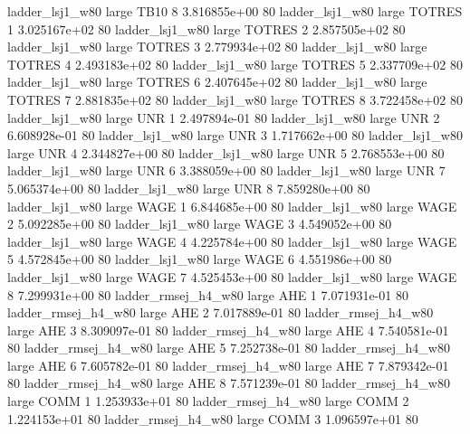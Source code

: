     ladder_lsj1_w80      large     TB10                 8 3.816855e+00 80
    ladder_lsj1_w80      large   TOTRES                 1 3.025167e+02 80
    ladder_lsj1_w80      large   TOTRES                 2 2.857505e+02 80
    ladder_lsj1_w80      large   TOTRES                 3 2.779934e+02 80
    ladder_lsj1_w80      large   TOTRES                 4 2.493183e+02 80
    ladder_lsj1_w80      large   TOTRES                 5 2.337709e+02 80
    ladder_lsj1_w80      large   TOTRES                 6 2.407645e+02 80
    ladder_lsj1_w80      large   TOTRES                 7 2.881835e+02 80
    ladder_lsj1_w80      large   TOTRES                 8 3.722458e+02 80
    ladder_lsj1_w80      large      UNR                 1 2.497894e-01 80
    ladder_lsj1_w80      large      UNR                 2 6.608928e-01 80
    ladder_lsj1_w80      large      UNR                 3 1.717662e+00 80
    ladder_lsj1_w80      large      UNR                 4 2.344827e+00 80
    ladder_lsj1_w80      large      UNR                 5 2.768553e+00 80
    ladder_lsj1_w80      large      UNR                 6 3.388059e+00 80
    ladder_lsj1_w80      large      UNR                 7 5.065374e+00 80
    ladder_lsj1_w80      large      UNR                 8 7.859280e+00 80
    ladder_lsj1_w80      large     WAGE                 1 6.844685e+00 80
    ladder_lsj1_w80      large     WAGE                 2 5.092285e+00 80
    ladder_lsj1_w80      large     WAGE                 3 4.549052e+00 80
    ladder_lsj1_w80      large     WAGE                 4 4.225784e+00 80
    ladder_lsj1_w80      large     WAGE                 5 4.572845e+00 80
    ladder_lsj1_w80      large     WAGE                 6 4.551986e+00 80
    ladder_lsj1_w80      large     WAGE                 7 4.525453e+00 80
    ladder_lsj1_w80      large     WAGE                 8 7.299931e+00 80
ladder_rmsej_h4_w80      large      AHE                 1 7.071931e-01 80
ladder_rmsej_h4_w80      large      AHE                 2 7.017889e-01 80
ladder_rmsej_h4_w80      large      AHE                 3 8.309097e-01 80
ladder_rmsej_h4_w80      large      AHE                 4 7.540581e-01 80
ladder_rmsej_h4_w80      large      AHE                 5 7.252738e-01 80
ladder_rmsej_h4_w80      large      AHE                 6 7.605782e-01 80
ladder_rmsej_h4_w80      large      AHE                 7 7.879342e-01 80
ladder_rmsej_h4_w80      large      AHE                 8 7.571239e-01 80
ladder_rmsej_h4_w80      large     COMM                 1 1.253933e+01 80
ladder_rmsej_h4_w80      large     COMM                 2 1.224153e+01 80
ladder_rmsej_h4_w80      large     COMM                 3 1.096597e+01 80
